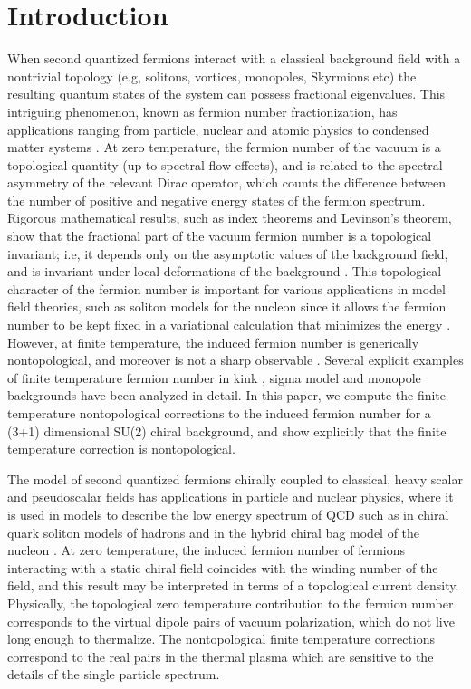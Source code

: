 \documentclass[a4paper,prd,showpacs,showkeys]{revtex4}
\begin{document}
\section{Introduction}
When second quantized fermions interact with  a classical background field with a nontrivial topology (e.g, solitons, vortices, monopoles, Skyrmions etc) the resulting quantum states of the system can possess fractional eigenvalues. This intriguing phenomenon, known as fermion number fractionization, has applications ranging from particle, nuclear and atomic physics to condensed matter systems \cite{jr,gold,jaffe,jackiw,wilczek,niemi,heeger,amo}. At zero temperature, the fermion number of the vacuum is a topological quantity (up to spectral flow effects), and is related to the spectral asymmetry of the relevant Dirac operator, which counts the difference between the number of positive and negative energy states of the fermion spectrum. Rigorous mathematical results, such as index theorems and Levinson's theorem, show that the fractional part of the vacuum fermion number is a topological invariant; i.e, it depends only on the asymptotic values of the background field, and is invariant under local deformations of the background \cite{niemi,macwilczek,boyanovsky,farhi}. This topological character of the fermion number is important for various applications in model field theories, such as soliton models for the nucleon since it allows the fermion number to be kept fixed in a variational calculation that minimizes the energy \cite{ripka,bhaduri,weigel}. However, at finite temperature, the induced fermion number is  generically nontopological, and moreover is not a sharp observable \cite{dunneian,dunne,fluc,nonlinearsigma}. Several explicit examples of finite temperature fermion number in kink \cite{semenoff,dunneian}, sigma model \cite{dunneian,fluc} and monopole \cite{cp,dunneian,feinberg} backgrounds have been analyzed in detail. In this paper, we compute the finite temperature nontopological corrections to the induced fermion number for a (3+1) dimensional SU(2) chiral background, and show explicitly that the finite temperature correction is nontopological.

The model of second quantized fermions chirally coupled to classical, heavy scalar and pseudoscalar fields has applications in particle and nuclear physics, where it is used in models to describe the low energy spectrum of QCD such as in chiral quark soliton models of hadrons \cite{diakonov,ball,ripka} and in the hybrid chiral bag model of the nucleon \cite{jaffe,bhaduri}. At zero temperature, the induced fermion number of fermions interacting with a static chiral field coincides with the winding number of the field, and this result may be interpreted in terms of a topological current density. Physically, the topological zero temperature contribution to the fermion number corresponds to the virtual dipole pairs of vacuum polarization, which do not live long enough to thermalize. The nontopological finite temperature corrections correspond to the real \coordHE{} pairs in the thermal plasma which are sensitive to the details of the single particle spectrum. 
\end{document}

